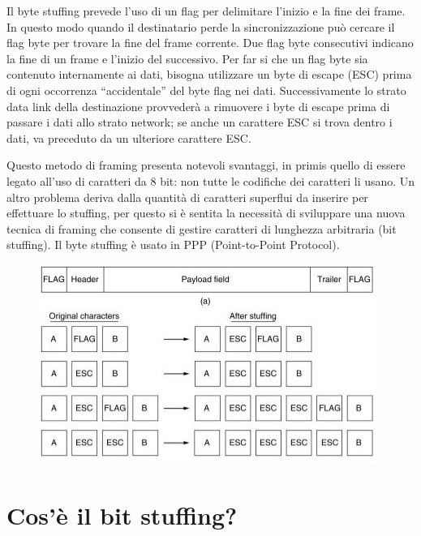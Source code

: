 Il byte stuffing prevede l'uso di un flag per delimitare l'inizio e la fine dei frame. In questo modo quando il destinatario perde la sincronizzazione può cercare il flag byte per trovare la fine del frame corrente. Due flag byte consecutivi indicano la fine di un frame e l'inizio del successivo.
Per far si che un flag byte sia contenuto internamente ai dati, bisogna utilizzare un byte di escape (ESC) prima di ogni occorrenza “accidentale” del byte flag nei dati. Successivamente lo strato data link della destinazione provvederà a rimuovere i byte di escape prima di passare i dati allo strato network; se anche un carattere ESC si trova dentro i dati, va preceduto da un ulteriore carattere ESC.

Questo metodo di framing presenta notevoli svantaggi, in primis quello di essere legato all'uso di caratteri da 8 bit: non tutte le codifiche dei caratteri li usano. Un altro problema deriva dalla quantità di caratteri superflui da inserire per effettuare lo stuffing, per questo si è sentita la necessità di sviluppare una nuova tecnica di framing che consente di gestire caratteri di lunghezza arbitraria (bit stuffing).
Il byte stuffing è usato in PPP (Point-to-Point Protocol).

\begin{figure}[H]
\centering
\includegraphics[scale=0.8]{res/img/13_ByteStuffing.png}
\end{figure}

\section{Cos'è il bit stuffing?}

